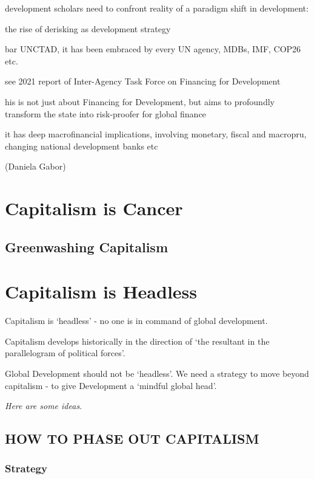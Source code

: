 \documentclass[
]{book}
\begin{document}
development scholars need to confront reality of a paradigm shift in development:

the rise of derisking as development strategy

bar UNCTAD, it has been embraced by every UN agency, MDBs, IMF, COP26 etc.

see 2021 report of Inter-Agency Task Force on Financing for Development

his is not just about Financing for Development, but aims to profoundly transform the state into risk-proofer for global finance

it has deep macrofinancial implications, involving monetary, fiscal and macropru, changing national development banks etc

(Daniela Gabor)

\hypertarget{capitalism-is-cancer}{%
\chapter{Capitalism is Cancer}\label{capitalism-is-cancer}}

\hypertarget{greenwashing-capitalism}{%
\section{Greenwashing Capitalism}\label{greenwashing-capitalism}}

\hypertarget{capitalism-is-headless}{%
\chapter{Capitalism is Headless}\label{capitalism-is-headless}}

Capitalism is `headless' - no one is in command of global development.

Capitalism develops historically in the direction of
`the resultant in the parallelogram of political forces'.

Global Development should not be `headless'.
We need a strategy to move beyond capitalism - to give Development a `mindful global head'.

\emph{Here are some ideas}.

\hypertarget{how-to-phase-out-capitalism}{%
\section{HOW TO PHASE OUT CAPITALISM}\label{how-to-phase-out-capitalism}}

\hypertarget{strategy}{%
\subsection{Strategy}\label{strategy}}
\end{document}
